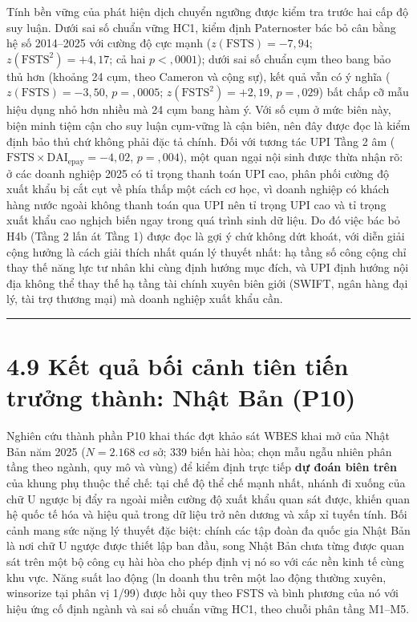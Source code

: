 \documentclass[
  a4paper,
  13pt]{extreport}
\begin{document}
Tính bền vững của phát hiện dịch chuyển ngưỡng được kiểm tra trước hai
cấp độ suy luận. Dưới sai số chuẩn vững HC1, kiểm định Paternoster bác
bỏ cân bằng hệ số 2014--2025 với cường độ cực mạnh
(\(z(\mathrm{FSTS}) = -7{,}94\); \(z(\mathrm{FSTS}^2) = +4{,}17\); cả
hai \(p < {,}0001\)); dưới sai số chuẩn cụm theo bang bảo thủ hơn
(khoảng 24 cụm, theo Cameron và cộng sự), kết quả vẫn có ý nghĩa
(\(z(\mathrm{FSTS}) = -3{,}50\), \(p = {,}0005\);
\(z(\mathrm{FSTS}^2) = +2{,}19\), \(p = {,}029\)) bất chấp cỡ mẫu hiệu
dụng nhỏ hơn nhiều mà 24 cụm bang hàm ý. Với số cụm ở mức biên này, biện
minh tiệm cận cho suy luận cụm-vững là cận biên, nên đây được đọc là
kiểm định bảo thủ chứ không phải đặc tả chính. Đối với tương tác UPI
Tầng 2 âm
(\(\mathrm{FSTS} \times \mathrm{DAI}_{\text{epay}} = -4{,}02\),
\(p = {,}004\)), một quan ngại nội sinh được thừa nhận rõ: ở các doanh
nghiệp 2025 có tỉ trọng thanh toán UPI cao, phân phối cường độ xuất khẩu
bị cắt cụt về phía thấp một cách cơ học, vì doanh nghiệp có khách hàng
nước ngoài không thanh toán qua UPI nên tỉ trọng UPI cao và tỉ trọng
xuất khẩu cao nghịch biến ngay trong quá trình sinh dữ liệu. Do đó việc
bác bỏ H4b (Tầng 2 lấn át Tầng 1) được đọc là gợi ý chứ không dứt khoát,
với diễn giải cộng hưởng là cách giải thích nhất quán lý thuyết nhất: hạ
tầng số công cộng chỉ thay thế năng lực tư nhân khi cùng định hướng mục
đích, và UPI định hướng nội địa không thể thay thế hạ tầng tài chính
xuyên biên giới (SWIFT, ngân hàng đại lý, tài trợ thương mại) mà doanh
nghiệp xuất khẩu cần.

\begin{center}\rule{0.5\linewidth}{0.5pt}\end{center}

\hypertarget{kux1ebft-quux1ea3-bux1ed1i-cux1ea3nh-tiuxean-tiux1ebfn-trux1b0ux1edfng-thuxe0nh-nhux1eadt-bux1ea3n-p10}{%
\section{4.9 Kết quả bối cảnh tiên tiến trưởng thành: Nhật Bản
(P10)}\label{kux1ebft-quux1ea3-bux1ed1i-cux1ea3nh-tiuxean-tiux1ebfn-trux1b0ux1edfng-thuxe0nh-nhux1eadt-bux1ea3n-p10}}

Nghiên cứu thành phần P10 khai thác đợt khảo sát WBES khai mở của Nhật
Bản năm 2025 (\(N = 2.168\) cơ sở; 339 biến hài hòa; chọn mẫu ngẫu nhiên
phân tầng theo ngành, quy mô và vùng) để kiểm định trực tiếp \textbf{dự
đoán biên trên} của khung phụ thuộc thể chế: tại chế độ thể chế mạnh
nhất, nhánh đi xuống của chữ U ngược bị đẩy ra ngoài miền cường độ xuất
khẩu quan sát được, khiến quan hệ quốc tế hóa và hiệu quả trong dữ liệu
trở nên dương và xấp xỉ tuyến tính. Bối cảnh mang sức nặng lý thuyết đặc
biệt: chính các tập đoàn đa quốc gia Nhật Bản là nơi chữ U ngược được
thiết lập ban đầu, song Nhật Bản chưa từng được quan sát trên một bộ
công cụ hài hòa cho phép định vị nó so với các nền kinh tế cùng khu vực.
Năng suất lao động (ln doanh thu trên một lao động thường xuyên,
winsorize tại phân vị 1/99) được hồi quy theo FSTS và bình phương của nó
với hiệu ứng cố định ngành và sai số chuẩn vững HC1, theo chuỗi phân
tầng M1--M5.
\end{document}
